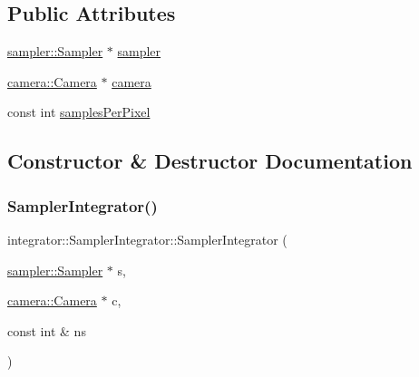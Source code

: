 \subsection*{Public Attributes}
\begin{DoxyCompactItemize}
\item 
\mbox{\hyperlink{classsampler_1_1Sampler}{sampler\+::\+Sampler}} $\ast$ \mbox{\hyperlink{classintegrator_1_1SamplerIntegrator_aba18513db3ec97411a54b11a2a6791a7}{sampler}}
\item 
\mbox{\hyperlink{classcamera_1_1Camera}{camera\+::\+Camera}} $\ast$ \mbox{\hyperlink{classintegrator_1_1SamplerIntegrator_aa86b6ccede7a595a1219869ed44d8e92}{camera}}
\item 
const int \mbox{\hyperlink{classintegrator_1_1SamplerIntegrator_a5efe3a51951d68701245544e220c9e8d}{samples\+Per\+Pixel}}
\end{DoxyCompactItemize}


\subsection{Constructor \& Destructor Documentation}
\mbox{\label{classintegrator_1_1SamplerIntegrator_ae74036826d99f191f14d6918b806601b}} 
\subsubsection{\texorpdfstring{SamplerIntegrator()}{SamplerIntegrator()}}
{\footnotesize\ttfamily integrator\+::\+Sampler\+Integrator\+::\+Sampler\+Integrator (\begin{DoxyParamCaption}\item[{\mbox{\hyperlink{classsampler_1_1Sampler}{sampler\+::\+Sampler}} $\ast$}]{s,  }\item[{\mbox{\hyperlink{classcamera_1_1Camera}{camera\+::\+Camera}} $\ast$}]{c,  }\item[{const int \&}]{ns }\end{DoxyParamCaption})}

\mbox{\label{classintegrator_1_1SamplerIntegrator_abf145ca0ae0e151609808ad5dc6e1564}} 

